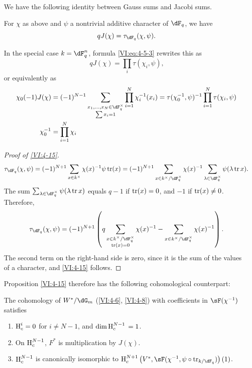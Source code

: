 We have the following identity between Gauss sums and Jacobi sums. 





\begin{proposition_}\label{VI:4-15}
For $\chi$ as above and $\psi$ a nontrivial additive character of 
$\dF_q$, we have 
\[
  q J(\chi) = \tau_{\dF_q}(\chi,\psi) \text{.} 
\]
\end{proposition_}

In the special case $k=\dF_q^n$, formula \eqref{VI:eq:4-5-3} rewrites this as 
\begin{equation*}\tag{4.15.1}\label{VI:eq:4-15-1}
  q J(\chi) = \prod_i \tau(\chi_i,\psi) \text{,} 
\end{equation*}
or equivalently as 
\begin{align*}
  \chi_0(-1) J(\chi) &= (-1)^{N-1} \sum_{\substack{x_1,\dots,x_N\in \dF_q^\times \\ \sum x_i = 1}} \prod_{i=1}^N \chi_i^{-1}(x_i) = \tau(\chi_0^{-1},\psi)^{-1} \prod_{i=1}^N \tau(\chi_i,\psi) \\
  \chi_0^{-1} &= \prod_{i=1}^N \chi_i 
\end{align*}





\begin{proof}[Proof of \ref{VI:4-15}]
\[
  \tau_{\dF_q}(\chi,\psi) = (-1)^{N+1} \sum_{x\in k^\times} \chi(x)^{-1} \psi \tr(x) = (-1)^{N+1} \sum_{x\in k^\times/\dF_q^\times} \chi(x)^{-1} \sum_{\lambda\in \dF_q^\times} \psi(\lambda \tr x) \text{.}
\]
The sum $\sum_{\lambda\in \dF_q^\times} \psi(\lambda \tr x)$ equals $q-1$ if 
$\operatorname{tr}(x)=0$, and $-1$ if $\operatorname{tr}(x)\ne 0$. Therefore, 
\[
  \tau_{\dF_q}(\chi,\psi) = (-1)^{N+1} \left(q\sum_{\substack{x\in k^\times/\dF_q^\times \\ \tr(x)=0}} \chi(x)^{-1} - \sum_{x\in k^\times/\dF_q^\times} \chi(x)^{-1}\right) \text{.}
\]
The second term on the right-hand side is zero, since it is the sum of the values 
of a character, and \ref{VI:4-15} follows. 
\end{proof}

Proposition \ref{VI:4-15} therefore has the following cohomological counterpart: 





\begin{proposition_}\label{VI:4-16}
The cohomology of $W^\ast/\dG_m$ (\ref{VI:4-6}, \ref{VI:4-8}) with coefficients 
in $\sF(\chi^{-1})$ satisfies 
\begin{enumerate}[\indent (i)]
  \item $\operatorname{H}_c^i=0$ for $i\ne N-1$, and $\dim \operatorname{H}_c^{N-1}{}=1$. 
  \item On $\operatorname{H}_c^{N-1}$, $F^\ast$ is multiplication by $J(\chi)$. 
  \item $\operatorname{H}_c^{N-1}$ is canonically isomorphic to 
    $\h_c^{N+1}\left(V^\ast,\sF(\chi^{-1},\psi\circ \tr_{k/\dF_q})\right)(1)$. 
\end{enumerate}
\end{proposition_}


